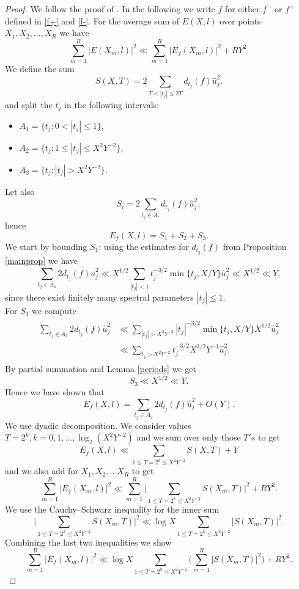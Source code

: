 \documentclass[a4paper,11pt]{amsart}
\theoremstyle{definition}
\begin{document}
\begin{proof}
We follow the proof of \cite[Prop. 5.3]{CP}.
In the following we write $f$ for either $f^{-}$ or $f^{+}$ defined in \eqref{f+} and \eqref{f-}. For the average sum of $E(X,l)$ over points $X_1,X_2, \dots ,X_R$ we have 
$$ \sum_{m=1}^R|E(X_m,l)|^2 \ll \sum_{m=1}^R|E_f(X_m,l)|^2+RY^2.$$
We define the sum
$$S(X,T)= 2\sum_{T<|t_j|\le 2T}d_{t_j}(f)\hat{u}_j^2.$$ 
and split the $t_j$ in the following intervals:
\begin{itemize}
  \item[] $A_1=\{t_j : 0<|t_j|\le 1\}$,
  \item[] $A_2=\{t_j : 1\le |t_j| \le X^2Y^{-2}\}$,
  \item[] $A_3=\{t_j : |t_j|>X^2Y^{-2}\}.$
\end{itemize}
Let also 
$$S_i=2\sum_{t_j\in A_i}d_{t_j}(f)\hat{u}_j^2,$$
hence
$$ E_f(X,l)=S_1+S_2+S_3.$$
We start by bounding $S_1$: using the estimates for $d_{t_j}(f)$ from Proposition \ref{mainprop} we have
$$\sum_{t_j\in A_1}2d_{t_j}(f)\hat{u}_j^2 \ll X^{1/2}\sum_{|t_j|<1}t_j^{-3/2}\min \{t_j,X/Y\}\hat{u}_j^2 \ll X^{1/2} \ll Y,$$
since there exist finitely many spectral parameters $|t_j|\le 1$.\\
For $S_3$ we compute
\begin{align}
    \begin{split}
        \sum_{t_j\in A_3}2d_{t_j}(f)\hat{u}_j^2 &\ll \sum_{|t_j|>X^2Y^{-2}}|t_j|^{-3/2}\min\{t_j,X/Y\}X^{1/2}\hat{u}_j^2 \\
        &\ll \sum_{t_j>X^2Y^{-2}}t_j^{-3/2}X^{3/2}Y^{-1}\hat{u}_j^2.
    \end{split}
\end{align}
By partial summation and Lemma \ref{periods} we get 
$$S_3 \ll X^{1/2} \ll Y.$$
Hence we have shown that
$$E_f(X,l) = \sum_{t_j\in A_2}2d_{t_j}(f)\hat{u}_j^2+O(Y).$$
We use dyadic decomposition. We consider values $T=2^k, k=0,1, \dots ,\log_2(X^2Y^{-2})$ and we sum over only those $T's$ to get
$$ E_f(X,l) \ll \sum_{1\le T=2^k \le X^2Y^{-2}}S(X,T)+Y$$ and we also add for $X_1,X_2,\dots X_R$ to get
$$ \sum_{m=1}^R|E_f(X_m,l)|^2 \ll \sum_{m=1}^R \Big|\sum_{1\le T=2^k \le X^2Y^{-2}}S(X_m,T)\Big|^2+RY^2.$$
We use the Cauchy--Schwarz inequality for the inner sum
$$\Big|\sum_{1\le T=2^k \le X^2Y^{-2}}S(X_m,T)\Big|^2 \ll \log X \sum_{1\le T=2^k \le X^2Y^{-2}}|S(X_m,T)|^2.$$
Combining the last two inequalities we show
$$\sum_{m=1}^R|E_f(X_m,l)|^2 \ll \log X \sum_{1 \le T=2^k \le X^2Y^{-2}}\Big(\sum_{m=1}^R|S(X_m,T)|^2\Big)+RY^2.$$

\end{proof}
\end{document}
